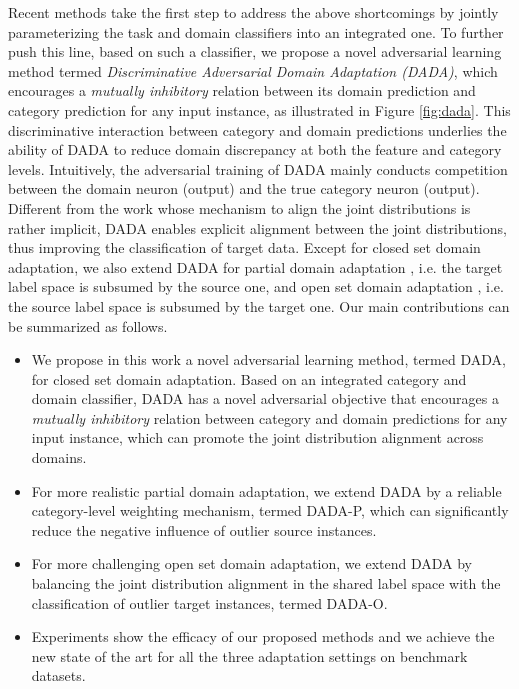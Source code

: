 \documentclass[letterpaper]{article} \usepackage{aaai20}  \usepackage{times}  \usepackage{helvet} \usepackage{courier}  \usepackage[hyphens]{url}  \usepackage{graphicx} \urlstyle{rm} \def\UrlFont{\rm}  \usepackage{graphicx}  \frenchspacing  \setlength{\pdfpagewidth}{8.5in}  \setlength{\pdfpageheight}{11in}
\begin{document}
Recent methods \cite{idda,dann_ca} take the first step to address the above shortcomings by jointly parameterizing the task and domain classifiers into an integrated one. To further push this line, based on such a classifier, we propose a novel adversarial learning method termed \emph{Discriminative Adversarial Domain Adaptation (DADA)}, which encourages a \emph{mutually inhibitory} relation between its domain prediction and category prediction for any input instance, as illustrated in Figure \ref{fig:dada}. This discriminative interaction between category and domain predictions underlies the ability of DADA to reduce domain discrepancy at both the feature and category levels. Intuitively, the adversarial training of DADA mainly conducts competition between the domain neuron (output) and the true category neuron (output). Different from the work \cite{dann_ca} whose mechanism to align the joint distributions is rather implicit, DADA enables explicit alignment between the joint distributions, thus improving the classification of target data. Except for closed set domain adaptation, we also extend DADA for partial domain adaptation \cite{pada}, i.e. the target label space is subsumed by the source one, and open set domain adaptation \cite{bp_for_os}, i.e. the source label space is subsumed by the target one. 
Our main contributions can be summarized as follows.
\begin{itemize}
	\item We propose in this work a novel adversarial learning method, termed DADA, for closed set domain adaptation. Based on an integrated category and domain classifier, DADA has a novel adversarial objective that encourages a \emph{mutually inhibitory} relation between category and domain predictions for any input instance, which can promote the joint distribution alignment across domains.
	
	\item For more realistic partial domain adaptation, we extend DADA by a reliable category-level weighting mechanism, termed DADA-P, which can significantly reduce the negative influence of outlier source instances. 
	
	\item For more challenging open set domain adaptation, we extend DADA by balancing the joint distribution alignment in the shared label space with the classification of outlier target instances, termed DADA-O.
	
	\item Experiments show the efficacy of our proposed methods and we achieve the new state of the art for all the three adaptation settings on benchmark datasets. 
\end{itemize}
\end{document}
